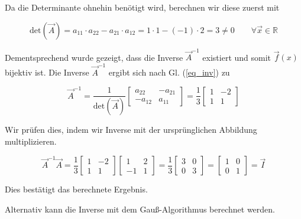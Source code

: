 {Da die Determinante ohnehin benötigt wird, berechnen wir diese zuerst mit

$$
\text{det}(\vec A) = a_{11} \cdot a_{22} - a_{21} \cdot a_{12} = 1 \cdot 1 - (-1) \cdot 2 = 3 \neq 0 \qquad \forall \vec x \in \mathbb{R} 
$$

Dementsprechend wurde gezeigt, dass die Inverse $\vec A^{-1}$ existiert und somit $\vec f(x)$ bijektiv ist. Die Inverse $\vec A^{-1}$ ergibt sich nach Gl. (\ref{eq_inv}) 
zu

$$
\vec A^{-1} =  \frac{1}{\text{det}(\vec A)} \begin{bmatrix}
a_{22} & -a_{21} \\ -a_{12} & a_{11}
\end{bmatrix} 
= \frac{1}{3} \begin{bmatrix}
1 & -2 \\ 1 & 1
\end{bmatrix}
$$

Wir prüfen dies, indem wir Inverse mit der ursprünglichen Abbildung multiplizieren.

$$
\vec A^{-1} \vec A = \frac{1}{3} \begin{bmatrix}
1 & -2 \\ 1 & 1
\end{bmatrix} 
\begin{bmatrix}
1 & 2 \\ -1 & 1
\end{bmatrix} =
\frac{1}{3} \begin{bmatrix}
3 & 0 \\ 0 & 3
\end{bmatrix} = \begin{bmatrix}
1 & 0 \\ 0 & 1
\end{bmatrix} = \vec I
$$

Dies bestätigt das berechnete Ergebnis.

Alternativ kann die Inverse mit dem Gauß-Algorithmus berechnet werden.
}

